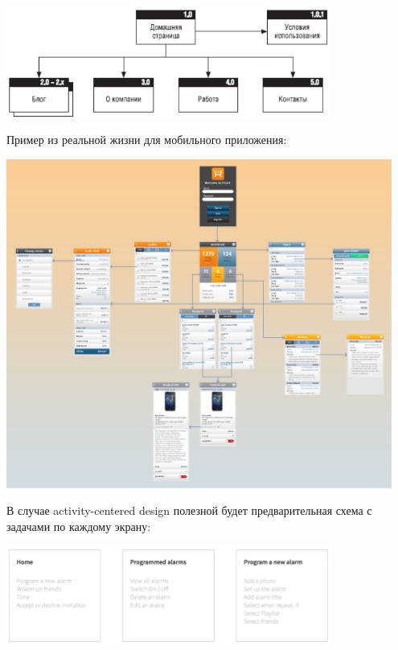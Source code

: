 \documentclass{../../text-style}
\begin{document}
\begin{center}
    \includegraphics[width=0.8\textwidth]{informationStructureSmall.png}
\end{center}

Пример из реальной жизни для мобильного приложения:

\begin{center}
    \includegraphics[width=0.95\textwidth]{screenMap.png}
\end{center}

В случае activity-centered design полезной будет предварительная схема с задачами по каждому экрану:

\begin{center}
    \includegraphics[width=0.8\textwidth]{screenTasks.png}
\end{center}
\end{document}

